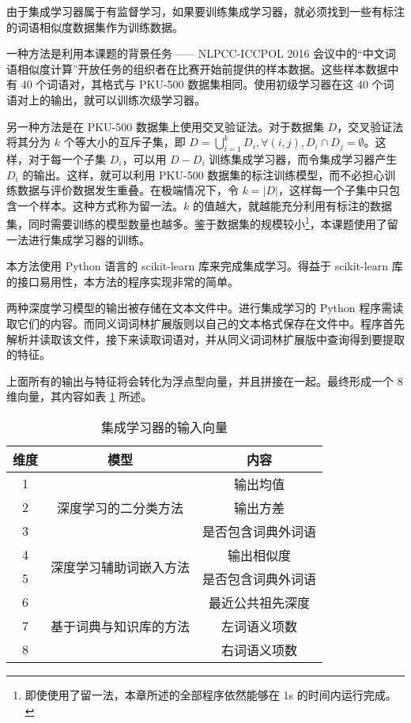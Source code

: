 由于集成学习器属于有监督学习，如果要训练集成学习器，就必须找到一些有标注的词语相似度数据集作为训练数据。

一种方法是利用本课题的背景任务—— NLPCC-ICCPOL 2016 会议中的“中文词语相似度计算”开放任务的组织者在比赛开始前提供的样本数据。这些样本数据中有 40 个词语对，其格式与 PKU-500 数据集相同。使用初级学习器在这 40 个词语对上的输出，就可以训练次级学习器。

另一种方法是在 PKU-500 数据集上使用交叉验证法。对于数据集 $D$，交叉验证法将其分为 $k$ 个等大小的互斥子集，即 $D = \bigcup_{i = 1}^k D_i, \forall (i, j), D_i \cap D_j = \emptyset$。这样，对于每一个子集 $D_i$，可以用 $D - D_i$ 训练集成学习器，而令集成学习器产生 $D_i$ 的输出。这样，就可以利用 PKU-500 数据集的标注训练模型，而不必担心训练数据与评价数据发生重叠。在极端情况下，令 $k = |D|$，这样每一个子集中只包含一个样本。这种方式称为留一法。$k$ 的值越大，就越能充分利用有标注的数据集，同时需要训练的模型数量也越多。鉴于数据集的规模较小\footnote{即使使用了留一法，本章所述的全部程序依然能够在 1s 的时间内运行完成。}，本课题使用了留一法进行集成学习器的训练。

本方法使用 Python 语言的 scikit-learn 库来完成集成学习。得益于 scikit-learn 库的接口易用性，本方法的程序实现非常的简单。

两种深度学习模型的输出被存储在文本文件中。进行集成学习的 Python 程序需读取它们的内容。而同义词词林扩展版则以自己的文本格式保存在文件中。程序首先解析并读取该文件，接下来读取词语对，并从同义词词林扩展版中查询得到要提取的特征。

上面所有的输出与特征将会转化为浮点型向量，并且拼接在一起。最终形成一个 8 维向量，其内容如表 \ref{t:features} 所述。

\begin{table}[h]
	\caption{集成学习器的输入向量}
	\label{t:features}
	\vspace{0.5em}\centering\wuhao
	\begin{tabular}{ccc}
		\toprule[1.5pt]
		维度 & 模型 & 内容 \\
		\midrule[1pt]
		1 & \multirow{3}{*}{深度学习的二分类方法} & 输出均值 \\
		2 &  & 输出方差 \\
		3 &  & 是否包含词典外词语 \\
		\hline
		4 & \multirow{2}{*}{深度学习辅助词嵌入方法} & 输出相似度 \\
		5 &  & 是否包含词典外词语 \\
		\hline
		6 & \multirow{3}{*}{基于词典与知识库的方法} & 最近公共祖先深度 \\
		7 &  & 左词语义项数 \\
		8 &  & 右词语义项数 \\
		\bottomrule[1.5pt]
	\end{tabular}
\end{table}

